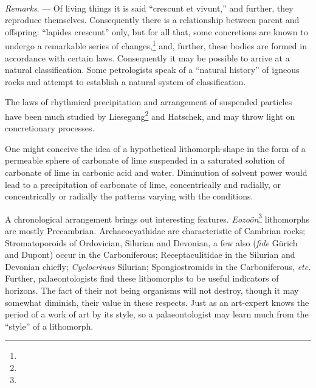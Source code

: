 \documentclass[a4paper, 12pt, oneside]{article}
\begin{document}
\paragraph{}
\emph{Remarks}. --- Of living things it is said ``crescunt et vivunt,'' and further, they reproduce themselves. Consequently there is a relationship between parent and offspring: ``lapides crescunt'' only, but for all that, some concretions are known to undergo a remarkable series of changes,\footnote{} and, further, these bodies are formed in accordance with certain laws. Consequently it may be possible to arrive at a natural classification. Some petrologists speak of a ``natural history'' of igneous rocks and attempt to establish a natural system of classification.

The laws of rhythmical precipitation and arrangement of suspended particles have been much studied by Liesegang\footnote{} and Hatschek, and may throw light on concretionary processes.

One might conceive the idea of a hypothetical lithomorph-shape in the form of a permeable sphere of carbonate of lime suspended in a saturated solution of carbonate of lime in carbonic acid and water. Diminution of solvent power would lead to a precipitation of carbonate of lime, concentrically and radially, or concentrically or radially the patterns varying with the conditions.

A chronological arrangement brings out interesting features. \emph{Eozoön}\footnote{} lithomorphs are mostly Precambrian. Archaeocyathidae are characteristic of Cambrian rocks; Stromatoporoids of Ordovician, Silurian and Devonian, a few also (\emph{fide} Gürich and Dupont) occur in the Carboniferous; Receptaculitidae in the Silurian and Devonian chiefly; \emph{Cyclocrinus} Silurian; Spongiostromids in the Carboniferous, \emph{etc.} Further, palaeontologists find these lithomorphs to be useful indicators of horizons. The fact of their not being organisms will not destroy, though it may somewhat diminish, their value in these respects. Just as an art-expert knows the period of a work of art by its style, so a palaeontologist may learn much from the ``style'' of a lithomorph.
\end{document}
